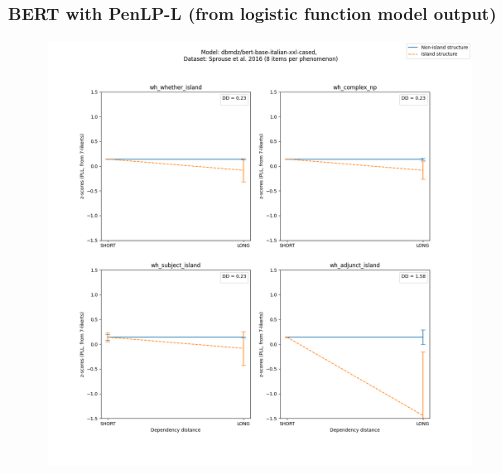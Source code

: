 \subsubsection{BERT with PenLP-L (from logistic function model output)}
\begin{figure}[h]
	\centering
	\includegraphics[width=1\textwidth]{images/Chapter1/Sprouse_wh_dbmdz_bert-base-italian-xxl-cased_PLL-zscores-likert-2022-07-11.png} 
\end{figure}

\clearpage
